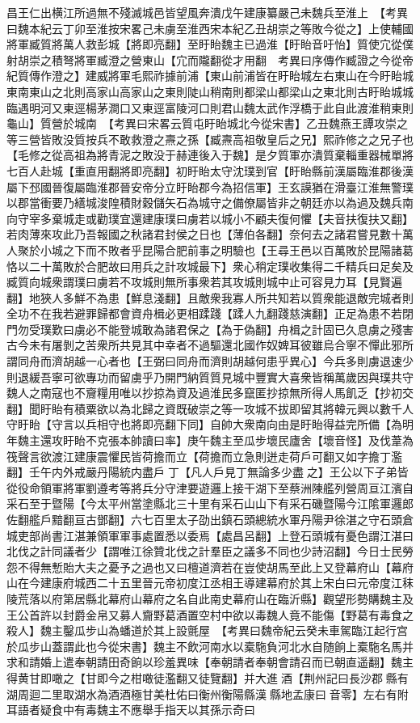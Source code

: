 昌王仁出横江所過無不殘滅城邑皆望風奔潰戊午建康纂嚴己未魏兵至淮上　【考異曰魏本紀云丁卯至淮按宋畧己未虜至淮西宋本紀乙丑胡崇之等敗今從之】上使輔國將軍臧質將萬人救彭城【將即亮翻】至盱眙魏主已過淮【盱眙音吁怡】質使宂從僕射胡崇之積弩將軍臧澄之營東山【宂而隴翻從才用翻　考異曰序傳作臧證之今從帝紀質傳作澄之】建威將軍毛熙祚據前浦【東山前浦皆在盱眙城左右東山在今盱眙城東南東山之北則高家山高家山之東則陡山稍南則都梁山都梁山之東北則古盱眙城城臨遇明河又東逕楊茅澗口又東逕富陵河口則君山魏太武作浮橋于此自此渡淮稍東則龜山】質營於城南　【考異曰宋畧云質屯盱眙城北今從宋書】乙丑魏燕王譚攻崇之等三營皆敗没質按兵不敢救澄之燾之孫【臧燾高祖敬皇后之兄】熙祚修之之兄子也【毛修之從高祖為將青泥之敗没于赫連後入于魏】是夕質軍亦潰質棄輜重器械單將七百人赴城【重直用翻將即亮翻】初盱眙太守沈璞到官【盱眙縣前漢屬臨淮郡後漢屬下邳國晉復屬臨淮郡晉安帝分立盱眙郡今為招信軍】王玄謨猶在滑臺江淮無警璞以郡當衝要乃繕城浚隍積財穀儲矢石為城守之備僚屬皆非之朝廷亦以為過及魏兵南向守宰多棄城走或勸璞宜還建康璞曰虜若以城小不顧夫復何懼【夫音扶復扶又翻】若肉薄來攻此乃吾報國之秋諸君封侯之日也【薄伯各翻】奈何去之諸君嘗見數十萬人聚於小城之下而不敗者乎昆陽合肥前事之明驗也【王尋王邑以百萬敗於昆陽諸葛恪以二十萬敗於合肥故曰用兵之計攻城最下】衆心稍定璞收集得二千精兵曰足矣及臧質向城衆謂璞曰虜若不攻城則無所事衆若其攻城則城中止可容見力耳【見賢遍翻】地狹人多鮮不為患【鮮息淺翻】且敵衆我寡人所共知若以質衆能退敵完城者則全功不在我若避罪歸都會資舟楫必更相蹂踐【蹂人九翻踐慈演翻】正足為患不若閉門勿受璞歎曰虜必不能登城敢為諸君保之【為于偽翻】舟楫之計固已久息虜之殘害古今未有屠剝之苦衆所共見其中幸者不過驅還北國作奴婢耳彼雖烏合寧不憚此邪所謂同舟而濟胡越一心者也【王弼曰同舟而濟則胡越何患乎異心】今兵多則虜退速少則退緩吾寧可欲專功而留虜乎乃開門納質質見城中豐實大喜衆皆稱萬歲因與璞共守魏人之南寇也不齎糧用唯以抄掠為資及過淮民多竄匿抄掠無所得人馬飢乏【抄初交翻】聞盱眙有積粟欲以為北歸之資既破崇之等一攻城不拔即留其將韓元興以數千人守盱眙【守言以兵相守也將即亮翻下同】自帥大衆南向由是盱眙得益完所備【為明年魏主還攻盱眙不克張本帥讀曰率】庚午魏主至瓜步壞民廬舍【壞音怪】及伐葦為筏聲言欲渡江建康震懼民皆荷擔而立【荷擔而立急則迸走荷戶可翻又如字擔丁濫翻】壬午内外戒嚴丹陽統内盡戶丁【凡人戶見丁無論多少盡之】王公以下子弟皆從役命領軍將軍劉遵考等將兵分守津要遊邏上接干湖下至蔡洲陳艦列營周亘江濱自采石至于暨陽【今太平州當塗縣北三十里有采石山山下有采石磯暨陽今江隂軍邏郎佐翻艦戶黯翻亘古鄧翻】六七百里太子劭出鎮石頭總統水軍丹陽尹徐湛之守石頭倉城吏部尚書江湛兼領軍軍事處置悉以委焉【處昌呂翻】上登石頭城有憂色謂江湛曰北伐之計同議者少【謂唯江徐贊北伐之計羣臣之議多不同也少詩沼翻】今日士民勞怨不得無慙貽大夫之憂予之過也又曰檀道濟若在豈使胡馬至此上又登幕府山【幕府山在今建康府城西二十五里晉元帝初度江丞相王導建幕府於其上宋白曰元帝度江秣陵荒落以府第居縣北幕府山幕府之名自此南史幕府山在臨沂縣】觀望形勢購魏主及王公首許以封爵金帛又募人齎野葛酒置空村中欲以毒魏人竟不能傷【野葛有毒食之殺人】魏主鑿瓜步山為蟠道於其上設氈屋　【考異曰魏帝紀云癸未車駕臨江起行宫於瓜步山蓋謂此也今從宋書】魏主不飲河南水以槖駞負河北水自随餉上槖駞名馬并求和請婚上遣奉朝請田奇餉以珍羞異味【奉朝請者奉朝會請召而已朝直遥翻】魏主得黄甘即噉之【甘即今之柑噉徒濫翻又徒覽翻】并大進酒【荆州記曰長沙郡縣有湖周迴二里取湖水為酒酒極甘美杜佑曰衡州衡陽縣漢縣地孟康曰音零】左右有附耳語者疑食中有毒魏主不應舉手指天以其孫示奇曰